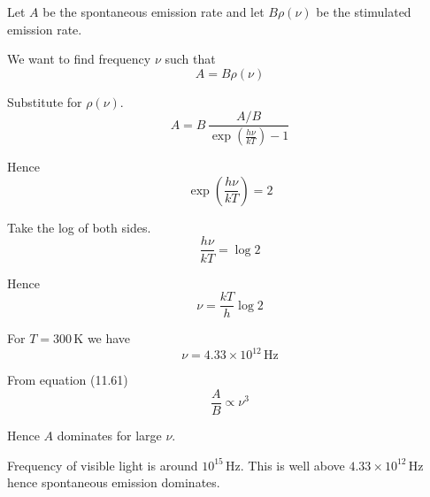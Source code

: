 



\bigskip
Let $A$ be the spontaneous emission rate and let $B\rho(\nu)$ be the stimulated emission rate.

\bigskip
We want to find frequency $\nu$ such that
\begin{equation*}
A=B\rho(\nu)
\end{equation*}

Substitute for $\rho(\nu)$.
\begin{equation*}
A=B\,\frac{A/B}{\exp\left(\frac{h\nu}{kT}\right)-1}
\end{equation*}

Hence
\begin{equation*}
\exp\left(\frac{h\nu}{kT}\right)=2
\end{equation*}

Take the log of both sides.
\begin{equation*}
\frac{h\nu}{kT}=\log2
\end{equation*}

Hence
\begin{equation*}
\nu=\frac{kT}{h}\log2
\end{equation*}

For $T=300\,\text{K}$ we have
\begin{equation*}
\nu=4.33\times10^{12}\,\text{Hz}
\end{equation*}

From equation (11.61)
\begin{equation*}
\frac{A}{B}\propto\nu^3
\end{equation*}

Hence $A$ dominates for large $\nu$.

\bigskip
Frequency of visible light is around $10^{15}\,\text{Hz}$.
This is well above $4.33\times10^{12}\,\text{Hz}$ hence spontaneous emission dominates.


